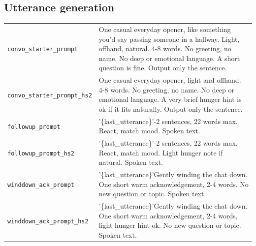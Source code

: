 \subsection*{Utterance generation}
\begingroup
\footnotesize
{}
\begin{longtable}{@{}>{\raggedright\arraybackslash}p{}>{\raggedright\arraybackslash}p{}@{}}
    \toprule
    \endfirsthead
    \endhead
    \bottomrule
    \endfoot
        \texttt{convo\_\allowbreak{}starter\_\allowbreak{}prompt} & One casual everyday opener, like something you'd say passing someone in a hallway. Light, offhand, natural. 4-8 words. No greeting, no name. No deep or emotional language. A short question is fine. Output only the sentence. \\
        \texttt{convo\_\allowbreak{}starter\_\allowbreak{}prompt\_\allowbreak{}hs2} & One casual everyday opener, light and offhand. 4-8 words. No greeting, no name. No deep or emotional language. A very brief hunger hint is ok if it fits naturally. Output only the sentence. \\
        \texttt{followup\_\allowbreak{}prompt} & '\{last\_utterance\}'\newline 1-2 sentences, 22 words max. React, match mood. Spoken text. \\
        \texttt{followup\_\allowbreak{}prompt\_\allowbreak{}hs2} & '\{last\_utterance\}'\newline 1-2 sentences, 22 words max. React, match mood. Light hunger note if natural. Spoken text. \\
        \texttt{winddown\_\allowbreak{}ack\_\allowbreak{}prompt} & '\{last\_utterance\}'\newline Gently winding the chat down. One short warm acknowledgement, 2-4 words. No new question or topic. Spoken text. \\
        \texttt{winddown\_\allowbreak{}ack\_\allowbreak{}prompt\_\allowbreak{}hs2} & '\{last\_utterance\}'\newline Gently winding the chat down. One short warm acknowledgement, 2-4 words, light hunger hint ok. No new question or topic. Spoken text. \\
\end{longtable}
\endgroup
{}
